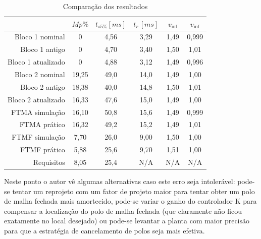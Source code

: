 \documentclass[
	12pt,				%
	article,			%
	openright,			%
	oneside,
	a4paper,			%
	chapter=TITLE,		%
	section=TITLE,		%
	english,			%
	french,				%
	spanish,			%
	brazil,				%
]{abntex2}
\begin{document}
                \begin{table}[]
                    \label{tab-resultados}
                    \centering
                    \caption{Comparação dos resultados}
                    \begin{tabular}{r|c|c|c|c|c}
                            &               $Mp\%$&     $t_{s5\%}[ms]$&     $t_r\,[ms]$ &       $v_{\inf}$ &	$v_{\inf}$ \\ \hline
                        Bloco 1 nominal&    0 	  &     4,56 &              3,29 &              1,49 & 			0,999 \\
                        Bloco 1 antigo&     0 	  &     4,70 &              3,40 &              1,50 & 			 1,01 \\
                        Bloco 1 atualizado& 0 	  &     4,88 &              3,12 &              1,49 & 			0,996 \\
                        Bloco 2 nominal&    19,25 &     49,0 &              14,0 &              1,49 &	  	     1,00 \\
                        Bloco 2 antigo&     18,38 &     40,0 &              14,8 &              1,50 & 			 1,01 \\
                        Bloco 2 atualizado& 16,33 &     47,6 &              15,0 &              1,49 &			 1,00 \\
                        FTMA simulação  &   16,10 &     50,8 &              15,6 &              1,49 & 			0,999 \\
                        FTMA prático  &     16,32 &     49,2 &              15,2 &              1,49 & 			 1,01 \\
                        FTMF simulação  &   7,70 &      26,0 &              9,00 &              1,50 & 			 1,00 \\
                        FTMF prático  &     5,88 &      25,6 &              9,70 &              1,51 &			 1,00 \\
                        Requisitos	  &		8,05 &		25,4 &				N/A	&				N/A	&			N/A
                    \end{tabular}
                \end{table}
                
                Neste ponto o autor vê algumas alternativas caso este erro seja intolerável: pode-se tentar um reprojeto com um fator de projeto maior para tentar obter um polo de malha fechada mais amortecido, pode-se variar o ganho do controlador K para compensar a localização do polo de malha fechada (que claramente não ficou exatamente no local desejado) ou pode-se levantar a planta com maior precisão para que a estratégia de cancelamento de polos seja mais efetiva.
                
\end{document}
